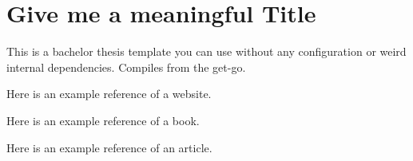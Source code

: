 \chapter{Give me a meaningful Title}
This is a bachelor thesis template you can use without any configuration or weird internal dependencies. Compiles from the get-go.

Here is an example reference of a website. \cite{google}

Here is an example reference of a book. \cite{goetz2006java}

Here is an example reference of an article. \cite{cattell2011scalable}
